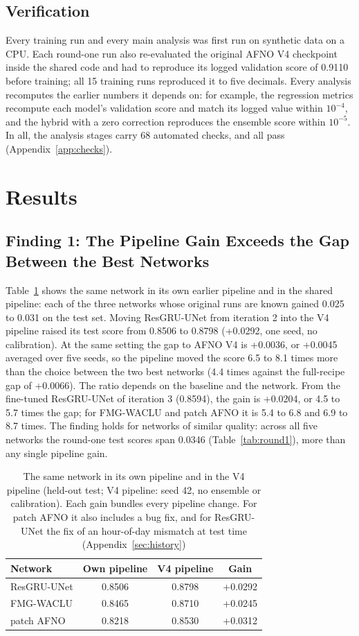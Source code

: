 \documentclass[journal]{IEEEtran}
\begin{document}
\subsection{Verification}
\label{sec:verify}
Every training run and every main analysis was first run on synthetic data on a CPU. Each round-one run also re-evaluated the original AFNO V4 checkpoint inside the shared code and had to reproduce its logged validation score of 0.9110 before training; all 15 training runs reproduced it to five decimals. Every analysis recomputes the earlier numbers it depends on: for example, the regression metrics recompute each model's validation score and match its logged value within $10^{-4}$, and the hybrid with a zero correction reproduces the ensemble score within $10^{-5}$. In all, the analysis stages carry 68 automated checks, and all pass (Appendix~\ref{app:checks}).

\section{Results}
\label{sec:results}
\subsection{Finding 1: The Pipeline Gain Exceeds the Gap Between the Best Networks}
Table~\ref{tab:samepipe} shows the same network in its own earlier pipeline and in the shared pipeline: each of the three networks whose original runs are known gained 0.025 to 0.031 on the test set. Moving ResGRU-UNet from iteration 2 into the V4 pipeline raised its test score from 0.8506 to 0.8798 (+0.0292, one seed, no calibration). At the same setting the gap to AFNO V4 is +0.0036, or +0.0045 averaged over five seeds, so the pipeline moved the score 6.5 to 8.1 times more than the choice between the two best networks (4.4 times against the full-recipe gap of +0.0066). The ratio depends on the baseline and the network. From the fine-tuned ResGRU-UNet of iteration 3 (0.8594), the gain is +0.0204, or 4.5 to 5.7 times the gap; for FMG-WACLU and patch AFNO it is 5.4 to 6.8 and 6.9 to 8.7 times. The finding holds for networks of similar quality: across all five networks the round-one test scores span 0.0346 (Table~\ref{tab:round1}), more than any single pipeline gain.

\begin{table}[!htb]
\centering
\caption{The same network in its own pipeline and in the V4 pipeline (held-out test; V4 pipeline: seed 42, no ensemble or calibration). Each gain bundles every pipeline change. For patch AFNO it also includes a bug fix, and for ResGRU-UNet the fix of an hour-of-day mismatch at test time (Appendix~\ref{sec:history})}
\label{tab:samepipe}
\begin{tabular}{@{}lccc@{}}
\toprule
Network & Own pipeline & V4 pipeline & Gain \\
\midrule
ResGRU-UNet & 0.8506 & 0.8798 & +0.0292 \\
FMG-WACLU & 0.8465 & 0.8710 & +0.0245 \\
patch AFNO & 0.8218 & 0.8530 & +0.0312 \\
\bottomrule
\end{tabular}
\end{table}
\end{document}
